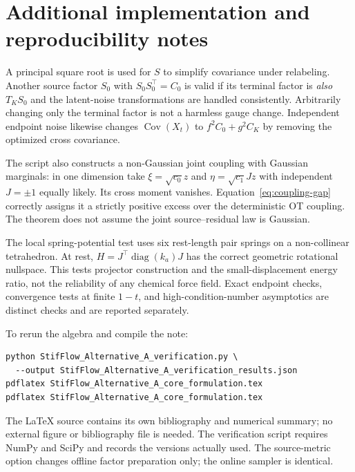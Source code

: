 \documentclass[11pt,letterpaper]{article}
\newcommand{\Cov}{\operatorname{Cov}}
\newcommand{\diag}{\operatorname{diag}}
\begin{document}
\section{Additional implementation and reproducibility notes}

A principal square root is used for $S$ to simplify covariance under relabeling. Another source factor $S_0$ with $S_0S_0^\top=C_0$ is valid if its terminal factor is \emph{also} $T_KS_0$ and the latent-noise transformations are handled consistently. Arbitrarily changing only the terminal factor is not a harmless gauge change. Independent endpoint noise likewise changes $\Cov(X_t)$ to $f^2C_0+g^2C_K$ by removing the optimized cross covariance.

The script also constructs a non-Gaussian joint coupling with Gaussian marginals: in one dimension take $\xi=\sqrt{c_0}z$ and $\eta=\sqrt{c_1}Jz$ with independent $J=\pm1$ equally likely. Its cross moment vanishes. Equation~\eqref{eq:coupling-gap} correctly assigns it a strictly positive excess over the deterministic OT coupling. The theorem does not assume the joint source--residual law is Gaussian.

The local spring-potential test uses six rest-length pair springs on a non-collinear tetrahedron. At rest, $H=J^\top\diag(k_a)J$ has the correct geometric rotational nullspace. This tests projector construction and the small-displacement energy ratio, not the reliability of any chemical force field. Exact endpoint checks, convergence tests at finite $1-t$, and high-condition-number asymptotics are distinct checks and are reported separately.

\begin{samepage}
To rerun the algebra and compile the note:
\begin{verbatim}
python StifFlow_Alternative_A_verification.py \
  --output StifFlow_Alternative_A_verification_results.json
pdflatex StifFlow_Alternative_A_core_formulation.tex
pdflatex StifFlow_Alternative_A_core_formulation.tex
\end{verbatim}
\end{samepage}
The \LaTeX{} source contains its own bibliography and numerical summary; no external figure or bibliography file is needed. The verification script requires NumPy and SciPy and records the versions actually used. The source-metric option changes offline factor preparation only; the online sampler is identical.
\end{document}

